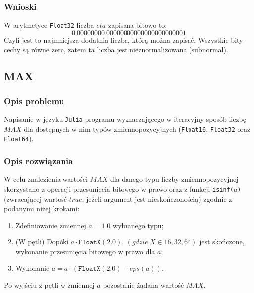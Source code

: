 \documentclass{classrep}
\begin{document}
		\subsubsection{Wnioski}
			W arytmetyce \texttt{Float32} liczba $eta$ zapisana bitowo to: $$0~00000000~00000000000000000000001$$
   			Czyli jest to najmniejsza dodatnia liczba, którą można zapisać.
   			Wszystkie bity cechy są równe zero, zatem ta liczba jest nieznormalizowana (subnormal).

	\subsection{MAX}
		\subsubsection{Opis problemu}
			Napisanie w języku \texttt{Julia} programu wyznaczającego w iteracyjny sposób liczbę 
			$MAX$ dla dostępnych w nim typów zmiennopozycyjnych (\texttt{Float16}, 
			\texttt{Float32} oraz \texttt{Float64}).
		\subsubsection{Opis rozwiązania}
			W celu znalezienia wartości $MAX$ dla danego typu liczby zmiennopozycyjnej skorzystano
			z operacji przesunięcia bitowego w prawo oraz z funkcji \texttt{isinf($a$)} (zwracającej wartość 
			$true$, jeżeli argument jest nieskończonością) zgodnie z podanymi niżej 
			krokami:
			\begin{enumerate}
				\item Zdefiniowanie zmiennej $a = 1.0$ wybranego typu;
				\item (W pętli) Dopóki $a \cdot \texttt{FloatX}(2.0), ~(gdzie ~X \in {16,32,64})$ jest skończone, wykonanie przesunięcia bitowego w prawo dla $a$;
				\item Wykonanie $a = a \cdot (\texttt{FloatX}(2.0) - eps(a))$.
			\end{enumerate}
			Po wyjściu z pętli w zmiennej $a$ pozostanie żądana wartość $MAX$.	
\end{document}
